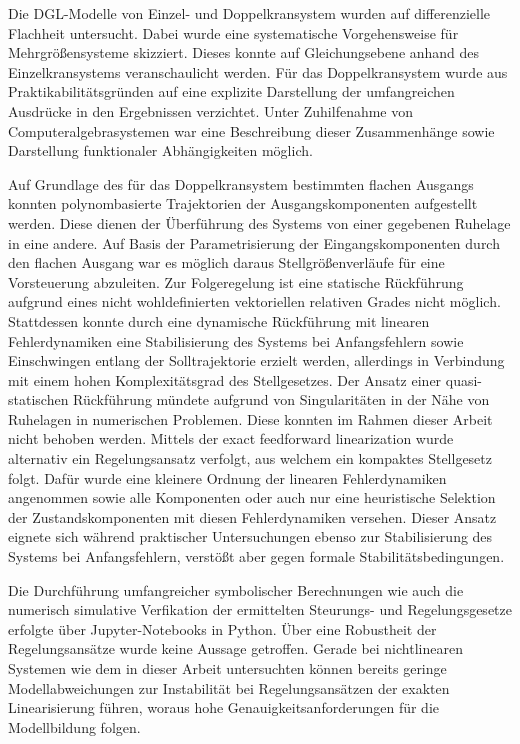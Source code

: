 Die DGL-Modelle von Einzel- und Doppelkransystem wurden auf differenzielle Flachheit untersucht. Dabei wurde eine systematische Vorgehensweise für Mehrgrößensysteme skizziert. Dieses konnte auf Gleichungsebene anhand des Einzelkransystems veranschaulicht werden. Für das Doppelkransystem wurde aus Praktikabilitätsgründen auf eine explizite Darstellung der umfangreichen Ausdrücke in den Ergebnissen verzichtet. Unter Zuhilfenahme von Computeralgebrasystemen war eine Beschreibung dieser Zusammenhänge sowie Darstellung funktionaler Abhängigkeiten möglich.

Auf Grundlage des für das Doppelkransystem bestimmten flachen Ausgangs konnten polynombasierte Trajektorien der Ausgangskomponenten aufgestellt werden. Diese dienen der Überführung des Systems von einer gegebenen Ruhelage in eine andere. Auf Basis der Parametrisierung der Eingangskomponenten durch den flachen Ausgang war es möglich daraus Stellgrößenverläufe für eine Vorsteuerung abzuleiten. Zur Folgeregelung ist eine statische Rückführung aufgrund eines nicht wohldefinierten vektoriellen relativen Grades nicht möglich. Stattdessen konnte durch eine dynamische Rückführung mit linearen Fehlerdynamiken eine Stabilisierung des Systems bei Anfangsfehlern sowie Einschwingen entlang der Solltrajektorie erzielt werden, allerdings in Verbindung mit einem hohen Komplexitätsgrad des Stellgesetzes. Der Ansatz einer quasi-statischen Rückführung mündete aufgrund von Singularitäten in der Nähe von Ruhelagen in numerischen Problemen. Diese konnten im Rahmen dieser Arbeit nicht behoben werden. Mittels der exact feedforward linearization wurde alternativ ein Regelungsansatz verfolgt, aus welchem ein kompaktes Stellgesetz folgt. Dafür wurde eine kleinere Ordnung der linearen Fehlerdynamiken angenommen sowie alle Komponenten oder auch nur eine heuristische Selektion der Zustandskomponenten mit diesen Fehlerdynamiken versehen. Dieser Ansatz eignete sich während praktischer Untersuchungen ebenso zur Stabilisierung des Systems bei Anfangsfehlern, verstößt aber gegen formale Stabilitätsbedingungen.

Die Durchführung umfangreicher symbolischer Berechnungen wie auch die numerisch simulative Verfikation der ermittelten Steurungs- und Regelungsgesetze erfolgte über Jupyter-Notebooks in Python. Über eine Robustheit der Regelungsansätze wurde keine Aussage getroffen. Gerade bei nichtlinearen Systemen wie dem in dieser Arbeit untersuchten können bereits geringe Modellabweichungen zur Instabilität bei Regelungsansätzen der exakten Linearisierung führen, woraus hohe Genauigkeitsanforderungen für die Modellbildung folgen.

